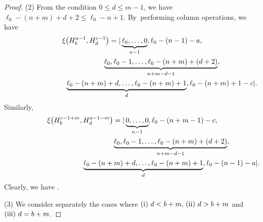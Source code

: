 \documentclass[pdftex]{sigma}
\numberwithin{equation}{section}
\begin{document}
\begin{proof}
(2) From the condition $0\leq d\leq m-1$, we have $\ell_{0}-(n+m)+d+2\leq \ell_{0}-n+1$. By~performing column operations, we have
\begin{gather*}
\xi\bigl(H^{a-1}_{b},H^{c-1}_{d}\bigr)=|\underbrace{\ell_0,\dots,0}_{n-1},\ell_{0}-(n-1)-a,\\
\hphantom{\xi\bigl(H^{a-1}_{b},H^{c-1}_{d}\bigr)=|}{}
\underbrace{\ell_{0},\ell_{0}-1,\dots,\ell_{0}-(n+m)+(d+2)}_{n+m-d-1},\nonumber\\
\hphantom{\xi\bigl(H^{a-1}_{b},H^{c-1}_{d}\bigr)=|}{}
\underbrace{\ell_{0}-(n+m)+d,\dots,\ell_{0}-(n+m)+1}_{d},\ell_{0}-(n+m)+1-c|\nonumber.
\end{gather*}
Similarly,
\begin{gather*}
\xi\bigl(H^{c-1+m}_{b},H^{a-1-m}_{d}\bigr)=|\underbrace{0,\dots,0}_{n-1},\ell_{0}-(n+m-1)-c,\\
\hphantom{\xi\bigl(H^{c-1+m}_{b},H^{a-1-m}_{d}\bigr)=|}{}
\underbrace{\ell_{0},\ell_{0}-1,\dots,\ell_{0}-(n+m)+(d+2)}_{n+m-d-1},\\
\hphantom{\xi\bigl(H^{c-1+m}_{b},H^{a-1-m}_{d}\bigr)=|}{}
\underbrace{\ell_{0}-(n+m)+d,\dots,\ell_{0}-(n+m)+1}_{d},\ell_{0}-(n-1)-a|.
\end{gather*}
Clearly, we have .

(3) We consider separately the cases where $({\rm i})\ d<b+m,\,({\rm ii})\ d>b+m$ and $({\rm iii})\ d=b+m$.


\end{proof}
\end{document}
